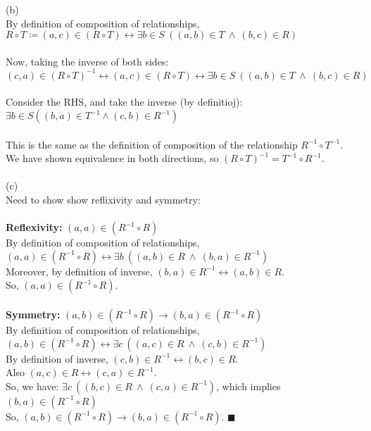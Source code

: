 \documentclass[a4paper]{article}
\begin{document}
\begin{enumerate}
    (b)\\
    By definition of composition of relationships, $R \circ T \coloneq (a, c) \in (R \circ T) \leftrightarrow \exists b \in S\ ((a, b) \in T\ \land\ (b, c) \in R)$\\
    \\
    Now, taking the inverse of both sides:\\
    $(c, a) \in (R \circ T)^{-1} \leftrightarrow (a, c) \in (R \circ T) \leftrightarrow \exists b \in S\ ((a, b) \in T\ \land\ (b, c) \in R)$\\
    \\
    Consider the RHS, and take the inverse (by definitioj):\\
    $\exists b \in S ((b, a) \in T^{-1} \land (c, b) \in R^{-1})$\\
    \\
    This is the same as the definition of composition of the relationship $R^{-1} \circ T^{-1} $.\\
    We have shown equivalence in both directions, so $(R \circ T)^{-1} = T^{-1} \circ R^{-1}$.\\
    \\
    (c)\\
    Need to show show reflixivity and symmetry:\\
    \\
    \textbf{Reflexivity:} $(a, a) \in (R^{-1} \circ R)$\\
    By definition of composition of relationships, $(a, a) \in (R^{-1} \circ R) \leftrightarrow \exists b\ ((a, b) \in R\ \land\ (b, a) \in R^{-1})$\\
    Moreover, by definition of inverse, $(b, a) \in R^{-1} \leftrightarrow (a, b) \in R$.\\
    So, $(a, a) \in (R^{-1} \circ R)$.\\
    \\
    \textbf{Symmetry:} $(a, b) \in (R^{-1} \circ R) \rightarrow (b, a) \in (R^{-1} \circ R)$\\
    By definition of composition of relationships, $(a, b) \in (R^{-1} \circ R) \leftrightarrow \exists c\ ((a, c) \in R\ \land\ (c, b) \in R^{-1})$\\
    By definition of inverse, $(c, b) \in R^{-1} \leftrightarrow (b, c) \in R$.\\
    Also $(a, c) \in R \leftrightarrow (c, a) \in R^{-1}$.\\
    So, we have: $\exists c\ ((b, c) \in R\ \land\ (c, a) \in R^{-1})$, which implies $(b, a) \in (R^{-1} \circ R)$\\
    So, $(a, b) \in (R^{-1} \circ R) \rightarrow (b, a) \in (R^{-1} \circ R)$. $\blacksquare$\\


\end{enumerate}
\end{document}
